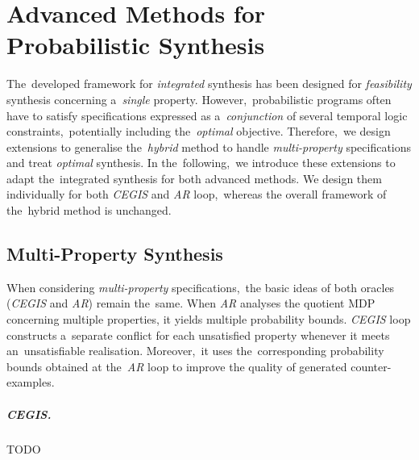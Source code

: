 \chapter{Advanced Methods for Probabilistic Synthesis}\label{chap:advanced}
The~developed framework for \textit{integrated} synthesis has been designed for \textit{feasibility} synthesis concerning a~\textit{single} property.
However,~probabilistic programs often have to satisfy specifications expressed as a~\textit{conjunction} of several temporal logic constraints,~potentially including the~\textit{optimal} objective.
Therefore,~we design extensions to generalise the~\textit{hybrid} method to handle \textit{multi-property} specifications and treat \textit{optimal} synthesis.
In the~following,~we introduce these extensions to adapt the~integrated synthesis for both advanced methods. 
We design them individually for both \emph{CEGIS} and \emph{AR} loop,~whereas the overall framework of the~hybrid method is unchanged.

\section{Multi-Property Synthesis}
When considering \textit{multi-property} specifications,~the basic ideas of both oracles (\textit{CEGIS} and \textit{AR}) remain the~same.
When \textit{AR} analyses the quotient MDP concerning multiple properties, it yields multiple probability bounds.
\textit{CEGIS} loop constructs a~separate conflict for each unsatisfied property whenever it meets an~unsatisfiable realisation.
Moreover,~it uses the~corresponding probability bounds obtained at the~\textit{AR} loop to improve the quality of generated counter-examples.

\paragraph{CEGIS.}
TODO

